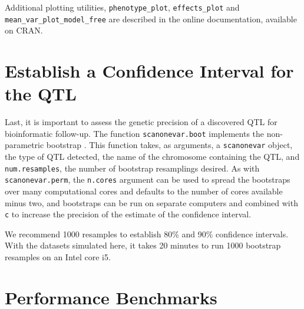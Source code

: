 
Additional plotting utilities, \texttt{phenotype\_plot}, \texttt{effects\_plot} and \texttt{mean\_var\_plot\_model\_free} are described in the online documentation, available on CRAN.

\section{Establish a Confidence Interval for the QTL}

Last, it is important to assess the genetic precision of a discovered QTL for bioinformatic follow-up.
The function \texttt{scanonevar.boot} implements the non-parametric bootstrap \citep{Visscher1996}.
This function takes, as arguments, a \texttt{scanonevar} object, the type of QTL detected, the name of the chromosome containing the QTL, and \texttt{num.resamples}, the number of bootstrap resamplings desired.
As with \texttt{scanonevar.perm}, the \texttt{n.cores} argument can be used to spread the bootstraps over many computational cores and defaults to the number of cores available minus two, and bootstraps can be run on separate computers and combined with \texttt{c} to increase the precision of the estimate of the confidence interval.

We recommend 1000 resamples to establish 80\% and 90\% confidence intervals.
With the datasets simulated here, it takes 20 minutes to run 1000 bootstrap resamples on an Intel core i5.






\section{Performance Benchmarks}


